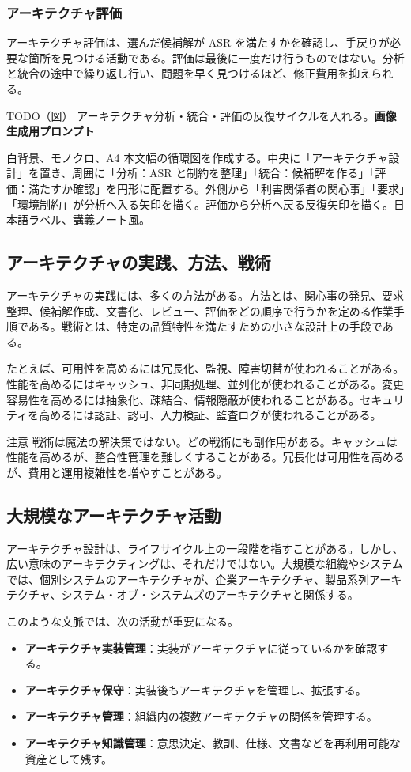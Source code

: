 \documentclass[a4paper,11pt]{ltjsarticle}
\newcommand{\todofig}[2]{\begin{statementbox}{TODO（図） #1}\textbf{画像生成用プロンプト}\par #2\end{statementbox}}
\newcommand{\keyterm}[1]{\textbf{#1}}
\begin{document}
\subsubsection{アーキテクチャ評価}
アーキテクチャ評価は、選んだ候補解が ASR を満たすかを確認し、手戻りが必要な箇所を見つける活動である。評価は最後に一度だけ行うものではない。分析と統合の途中で繰り返し行い、問題を早く見つけるほど、修正費用を抑えられる。

\todofig{アーキテクチャ分析・統合・評価の反復サイクルを入れる。}{白背景、モノクロ、A4 本文幅の循環図を作成する。中央に「アーキテクチャ設計」を置き、周囲に「分析：ASR と制約を整理」「統合：候補解を作る」「評価：満たすか確認」を円形に配置する。外側から「利害関係者の関心事」「要求」「環境制約」が分析へ入る矢印を描く。評価から分析へ戻る反復矢印を描く。日本語ラベル、講義ノート風。}

\subsection{アーキテクチャの実践、方法、戦術}
アーキテクチャの実践には、多くの方法がある。方法とは、関心事の発見、要求整理、候補解作成、文書化、レビュー、評価をどの順序で行うかを定める作業手順である。戦術とは、特定の品質特性を満たすための小さな設計上の手段である。

たとえば、可用性を高めるには冗長化、監視、障害切替が使われることがある。性能を高めるにはキャッシュ、非同期処理、並列化が使われることがある。変更容易性を高めるには抽象化、疎結合、情報隠蔽が使われることがある。セキュリティを高めるには認証、認可、入力検証、監査ログが使われることがある。

\begin{statementbox}{注意}
戦術は魔法の解決策ではない。どの戦術にも副作用がある。キャッシュは性能を高めるが、整合性管理を難しくすることがある。冗長化は可用性を高めるが、費用と運用複雑性を増やすことがある。
\end{statementbox}

\subsection{大規模なアーキテクチャ活動}
アーキテクチャ設計は、ライフサイクル上の一段階を指すことがある。しかし、広い意味のアーキテクティングは、それだけではない。大規模な組織やシステムでは、個別システムのアーキテクチャが、企業アーキテクチャ、製品系列アーキテクチャ、システム・オブ・システムズのアーキテクチャと関係する。

このような文脈では、次の活動が重要になる。
\begin{itemize}
  \item \keyterm{アーキテクチャ実装管理}：実装がアーキテクチャに従っているかを確認する。
  \item \keyterm{アーキテクチャ保守}：実装後もアーキテクチャを管理し、拡張する。
  \item \keyterm{アーキテクチャ管理}：組織内の複数アーキテクチャの関係を管理する。
  \item \keyterm{アーキテクチャ知識管理}：意思決定、教訓、仕様、文書などを再利用可能な資産として残す。
\end{itemize}
\end{document}
